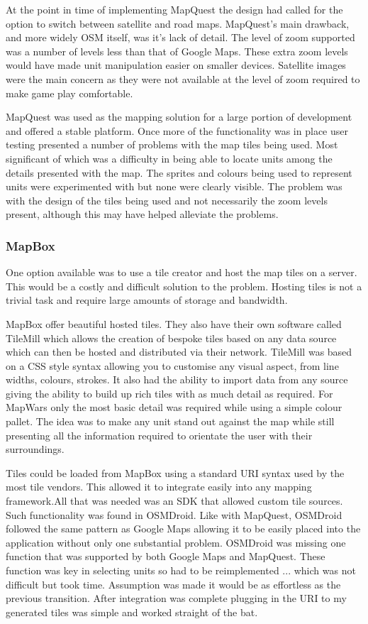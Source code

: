 At the point in time of implementing MapQuest the design had called for the option to switch between satellite and road maps. MapQuest's main drawback, and more widely OSM itself, was it's lack of detail. The level of zoom supported was a number of levels less than that of Google Maps. These extra zoom levels would have made unit manipulation easier on smaller devices. Satellite images were the main concern as they were not available at the level of zoom required to make game play comfortable.

MapQuest was used as the mapping solution for a large portion of development and offered a stable platform. Once more of the functionality was in place user testing presented a number of problems with the map tiles being used. Most significant of which was a difficulty in being able to locate units among the details presented with the map. The sprites and colours being used to represent units were experimented with but none were clearly visible. The problem was with the design of the tiles being used and not necessarily the zoom levels present, although this may have helped alleviate the problems.

\subsubsection{MapBox}
One option available was to use a tile creator and host the map tiles on a server. This would be a costly and difficult solution to the problem. Hosting tiles is not a trivial task and require large amounts of storage and bandwidth.

MapBox offer beautiful hosted tiles. They also have their own software called TileMill which allows the creation of bespoke tiles based on any data source which can then be hosted and distributed via their network. TileMill was based on a CSS style syntax allowing you to customise any visual aspect, from line widths, colours, strokes. It also had the ability to import data from any source giving the ability to build up rich tiles with as much detail as required. For MapWars only the most basic detail was required while using a simple colour pallet. The idea was to make any unit stand out against the map while still presenting all the information required to orientate the user with their surroundings. 

Tiles could be loaded from MapBox using a standard URI syntax used by the most tile vendors. This allowed it to integrate easily into any mapping framework.All that was needed was an SDK that allowed custom tile sources. Such functionality was found in OSMDroid. Like with MapQuest, OSMDroid followed the same pattern as Google Maps allowing it to be easily placed into the application without only one substantial problem. OSMDroid was missing one function that was supported by both Google Maps and MapQuest. These function was key in selecting units so had to be reimplemented ... which was not difficult but took time. Assumption was made it would be as effortless as the previous transition. After integration was complete plugging in the URI to my generated tiles was simple and worked straight of the bat.

